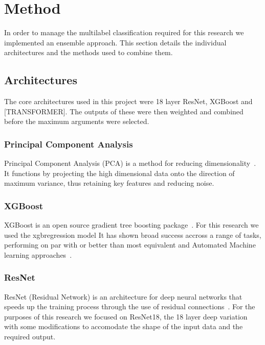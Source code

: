 \section{Method}

In order to manage the multilabel classification required for this research we implemented an ensemble approach.
This section details the individual architectures and the methods used to combine them.

\subsection{Architectures}

The core architectures used in this project were 18 layer ResNet, XGBoost and [TRANSFORMER]. The outputs of these were
then weighted and combined before the maximum arguments were selected.

\subsubsection{Principal Component Analysis}
Principal Component Analysis (PCA) is a method for reducing dimensionality~\cite{pcapaper}. It functions by projecting the high dimensional data onto the direction of maximum variance, thus retaining key features and reducing noise.



\subsubsection{XGBoost}
XGBoost is an open source gradient tree boosting package~\cite{xgboost}.
For this research we used the xgbregression model It has shown broad success accross a range of tasks, performing on par with or better than most equivalent and Automated Machine learning approaches~\cite{xgbcomp}.
\subsubsection{ResNet}
ResNet (Residual Network) is an architecture for deep neural networks that speeds up the training process through the use of residual connections~\cite{resnet}.
For the purposes of this research we focused on ResNet18, the 18 layer deep variation with some modifications to accomodate the shape of the input data and the required output.
